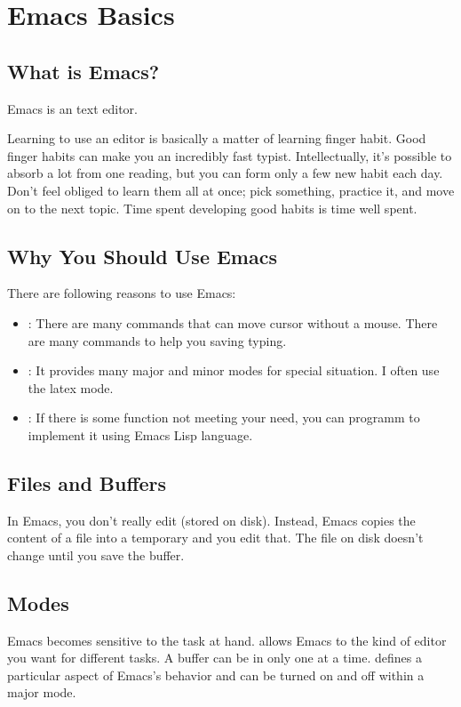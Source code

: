 \chapter{Emacs Basics}
\section{What is Emacs?}

Emacs is an text editor.


Learning to use an editor is basically a matter of learning finger habit.
Good finger habits can make you an incredibly fast typist.
Intellectually, it's possible to absorb a lot from one reading, but you can form only a few new habit each day.
Don't feel obliged  to learn them all at once; pick something, practice it, and move on to the next topic.
Time spent developing good habits is time well spent.


\section{Why You Should Use Emacs}
There are following reasons to use Emacs:
\begin{itemize}
\item {}: There are many commands that can move cursor without a mouse. There are many commands to help you saving typing.
\item {}: It provides many major and minor modes for special situation. I often use the latex mode.
\item {}: If there is some function not meeting your need, you can programm to implement it using Emacs Lisp language.
\end{itemize}



\section{Files and Buffers}
In Emacs, you don't really edit  (stored on disk).
Instead, Emacs copies the content of a file into a temporary  and you edit that.
The file on disk doesn't change until you save the buffer.

\section{Modes}
Emacs becomes sensitive to the task at hand.
 allows Emacs to the kind of editor you want for different tasks.
A buffer can be in only one  at a time.
 defines a particular aspect of Emacs's behavior and can be turned on and off within a major mode.


